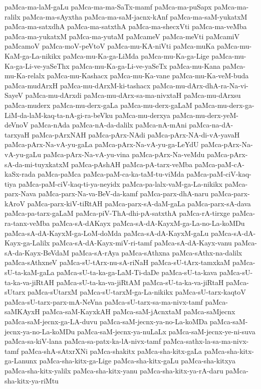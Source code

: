 {paMca-ma-laM-gaLu
paMca-ma-ma-SaTx-mamf
paMca-ma-puSapx
paMca-ma-ralilx
paMca-ma-sAyxtha
paMca-ma-saM-jacnx-kAnf
paMca-ma-saM-yukatxM
paMca-ma-satxdhA
paMca-ma-satxthA
paMca-ma-shecxVti
paMca-ma-veMba
paMca-ma-yukatxM
paMca-ma-yutaM
paMcameV
paMca-meVti
paMcamiV
paMcamoV
paMca-moV-peVtoV
paMca-mu-KA-niVti
paMca-muKa
paMca-mu-KaM-ga-La-nikikx
paMca-mu-Ka-ga-LiMda
paMca-mu-Ka-ga-Lige
paMca-mu-Ka-ga-Li-ve-yaSeThx
paMca-mu-Ka-ga-Li-ve-yaSeTx
paMca-mu-Kana
paMca-mu-Ka-relalx
paMca-mu-Kashacx
paMca-mu-Ka-vane
paMca-mu-Ka-veM-buda
paMca-mudArxH
paMca-mu-dArxM-ki-tashacx
paMca-mu-dArx-dhA-ra-Na-vi-SayeV
paMca-mu-dArxdi
paMca-mu-dArx-sa-ma-nivxtaH
paMca-mu-dArxsu
paMca-muderx
paMca-mu-derx-gaLa
paMca-mu-derx-gaLaM
paMca-mu-derx-ga-LiM-da-laM-kaq-ta-nA-gi-ra-beVku
paMca-mu-derxya
paMca-mu-derx-yeM-deVnoV
paMca-nAda
paMca-nA-da-dalilx
paMca-nA-mAni
paMca-na-dA-tarxyaH
paMca-pArxNAH
paMca-pArx-NAdi
paMca-pArx-NA-di-vA-yavaH
paMca-pArx-Na-vA-yu-gaLa
paMca-pArx-Na-vA-yu-ga-LeYdU
paMca-pArx-Na-vA-yu-gaLu
paMca-pArx-Na-vA-yu-vina
paMca-pArx-Na-veMdu
paMca-pArx-sA-da-mi-tuyxkatxM
paMca-pAshAH
paMca-pA-tarx-veMba
paMca-paM-cA-kaSx-rada
paMca-paMca
paMca-paM-ca-ka-taM-tu-viMda
paMca-paM-ciV-kaq-tiya
paMca-paM-ciV-kaq-ti-ya-neyidx
paMca-pa-lalx-vaM-ga-La-nikikx
paMca-parx-Nava
paMca-parx-Na-va-BeV-da-kamf
paMca-parx-dhA-naru
paMca-parx-kAroV
paMca-parx-kiV-tiRtAH
paMca-parx-sA-daM-gaLa
paMca-parx-sA-dava
paMca-pa-tarx-gaLaM
paMca-piV-ThA-dhi-pA-satxthA
paMca-rA-tirxge
paMca-ra-tanx-veMba
paMca-sA-dAKayx
paMca-sA-dA-KayxM-ga-La-no-La-koMDu
paMca-sA-dA-KayxM-ga-LoM-doMda
paMca-sA-dA-KayxM-gaLu
paMca-sA-dA-Kayx-ga-Lalilx
paMca-sA-dA-Kayx-miV-ri-tamf
paMca-sA-dA-Kayx-vanu
paMca-sA-da-Kayx-BeVdaM
paMca-sA-rAya
paMca-sAthxna
paMca-sAthx-na-dalilx
paMca-sAthxneV
paMca-sU-tArx-nu-sA-riNaH
paMca-sU-tArx-tamxkaM
paMca-sU-ta-kaM-gaLa
paMca-sU-ta-ka-ga-LaM-Ti-daDe
paMca-sU-ta-kava
paMca-sU-ta-ka-va-jiRtAH
paMca-sU-ta-ka-va-jiRtAM
paMca-sU-ta-ka-va-jiRtaH
paMca-sUtarx
paMca-sUtarxM
paMca-sU-tarxM-ga-La-nikikx
paMca-sU-tarx-kaqtoV
paMca-sU-tarx-parx-mA-NeVna
paMca-sU-tarx-sa-ma-nivx-tamf
paMca-saMKAyxH
paMca-saM-KayxkAH
paMca-saM-jAcnxtaM
paMca-saMjecnx
paMca-saM-jecnx-ga-LA-duvu
paMca-saM-jecnx-ya-no-La-koMDa
paMca-saM-jecnx-ya-no-La-koMDu
paMca-saM-jecnx-ya-nuLaLx
paMca-saM-jecnx-ye-ni-suva
paMca-sa-kiV-lana
paMca-sa-patx-ka-lA-nivx-tamf
paMca-sathx-la-sa-ma-nivx-tamf
paMca-shA-sAtxrXNi
paMca-shakitx
paMca-sha-kitx-gaLa
paMca-sha-kitx-ga-Lanunx
paMca-sha-kitx-ga-Lige
paMca-sha-kitx-gaLu
paMca-sha-kitxya
paMca-sha-kitx-yalilx
paMca-sha-kitx-yanu
paMca-sha-kitx-ya-rA-daru
paMca-sha-kitx-ya-riMtu
}
